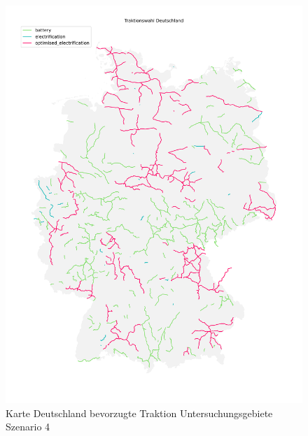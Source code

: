 \begin{center}
	\begin{figure}[!h]
	\includegraphics[height=0.8\paperheight]{../report_scenarios/s_4/files/deutschland_map.png}
	\caption{\label{fig_s_4_d_map} Karte Deutschland bevorzugte Traktion Untersuchungsgebiete Szenario 4}
	\end{figure}
\end{center}